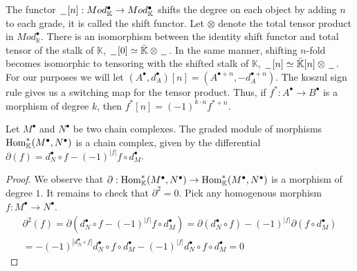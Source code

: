 \documentclass[../thesis.tex]{subfiles}
\begin{document}
            The functor $\argument[n]:Mod_\mathbb{K}^\bullet\rightarrow Mod_\mathbb{K}^\bullet$ shifts the degree on each object by adding $n$ to each grade, it is called the shift functor. Let $\otimes$ denote the total tensor product in $Mod_\mathbb{K}^\bullet$. There is an isomorphism between the identity shift functor and total tensor of the stalk of $\mathbb{K}$, $\argument[0] \simeq \bar{\mathbb{K}}\otimes\argument$. In the same manner, shifting $n$-fold becomes isomorphic to tensoring with the shifted stalk of $\mathbb{K}$, $\argument[n] \simeq \bar{\mathbb{K}}[n]\otimes\argument$. For our purposes we will let $(A^\bullet, d_A^\bullet)[n] = (A^{\bullet + n}, -d_A^{\bullet + n})$. The koszul sign rule gives us a switching map for the tensor product. Thus, if $f^*:A^\bullet\rightarrow B^\bullet$ is a morphism of degree $k$, then $f^*[n] = (-1)^{k\cdot n}f^{*+n}$.

            \begin{proposition}
                Let $M^{\bullet}$ and $N^{\bullet}$ be two chain complexes. The graded module of morphisms $\tt{Hom}_{\mathbb{K}}^*(M^{\bullet},N^{\bullet})$ is a chain complex, given by the differential $\partial(f) = d_N^{\bullet}\circ f - (-1)^{|f|}f\circ d_M^{\bullet}$.
            \end{proposition}

            \begin{proof}
                We observe that $\partial : \tt{Hom}_{\mathbb{K}}^*(M^{\bullet},N^{\bullet}) \rightarrow \tt{Hom}_{\mathbb{K}}^*(M^{\bullet},N^{\bullet})$ is a morphism of degree $1$. It remains to check that $\partial^2 = 0$. Pick any homogenous morphism $f : M^{\bullet}\rightarrow N^{\bullet}$.
                \begin{multline*}
                    \partial^2(f) = \partial(d_N^{\bullet}\circ f - (-1)^{|f|}f\circ d_M^{\bullet}) = \partial(d_N^{\bullet}\circ f) - (-1)^{|f|}\partial(f\circ d_M^{\bullet}) \\ = - (-1)^{|d_N^{\bullet}\circ f|}d_N^{\bullet}\circ f\circ d_M^{\bullet} - (-1)^{|f|}d_N^{\bullet}\circ f\circ d_M^{\bullet} = 0
                \end{multline*}
            \end{proof}
\end{document}
